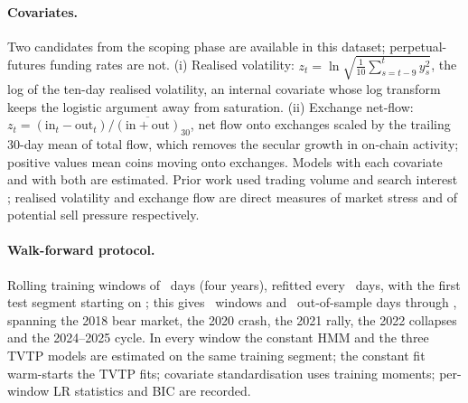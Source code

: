 \documentclass[11pt,a4paper]{article}
\begin{document}
\paragraph{Covariates.} Two candidates from the scoping phase are available in this dataset; perpetual-futures funding rates are not. (i) Realised volatility: $z_t=\ln\sqrt{\tfrac{1}{10}\sum_{s=t-9}^{t}y_s^2}$, the log of the ten-day realised volatility, an internal covariate whose log transform keeps the logistic argument away from saturation. (ii) Exchange net-flow: $z_t=(\mathrm{in}_t-\mathrm{out}_t)/\overline{(\mathrm{in}+\mathrm{out})}_{30}$, net flow onto exchanges scaled by the trailing 30-day mean of total flow, which removes the secular growth in on-chain activity; positive values mean coins moving onto exchanges. Models with each covariate and with both are estimated. Prior work used trading volume and search interest \citep{tan2021}; realised volatility and exchange flow are direct measures of market stress and of potential sell pressure respectively.

\paragraph{Walk-forward protocol.} Rolling training windows of \TrainLen\ days (four years), refitted every \TestLen\ days, with the first test segment starting on \OOSStart; this gives \NWindows\ windows and \NOOS\ out-of-sample days through \OOSEnd, spanning the 2018 bear market, the 2020 crash, the 2021 rally, the 2022 collapses and the 2024--2025 cycle. In every window the constant HMM and the three TVTP models are estimated on the same training segment; the constant fit warm-starts the TVTP fits; covariate standardisation uses training moments; per-window LR statistics and BIC are recorded.
\end{document}
